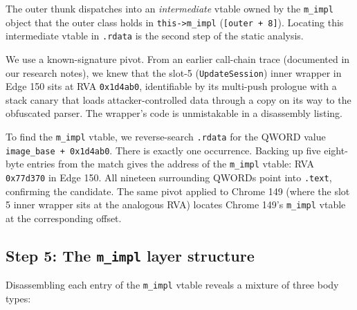 \documentclass[11pt,letterpaper]{article}
\begin{document}
The outer thunk dispatches into an \emph{intermediate} vtable owned
by the \texttt{m\_impl} object that the outer class holds in
\texttt{this->m\_impl} (\texttt{[outer + 8]}). Locating this
intermediate vtable in \texttt{.rdata} is the second step of the
static analysis.

We use a known-signature pivot. From an earlier call-chain trace
(documented in our research notes), we knew that the slot-5
(\texttt{UpdateSession}) inner wrapper in Edge 150 sits at RVA
\texttt{0x1d4ab0}, identifiable by its multi-push prologue with a
stack canary that loads attacker-controlled data through a copy on
its way to the obfuscated parser. The wrapper's code is unmistakable
in a disassembly listing.

To find the \texttt{m\_impl} vtable, we reverse-search \texttt{.rdata}
for the QWORD value \texttt{image\_base + 0x1d4ab0}. There is
exactly one occurrence. Backing up five eight-byte entries from the
match gives the address of the \texttt{m\_impl} vtable: RVA
\texttt{0x77d370} in Edge 150. All nineteen surrounding QWORDs
point into \texttt{.text}, confirming the candidate. The same pivot
applied to Chrome 149 (where the slot 5 inner wrapper sits at the
analogous RVA) locates Chrome 149's \texttt{m\_impl} vtable at the
corresponding offset.

\subsection{Step 5: The \texttt{m\_impl} layer structure}
\label{sec:static-layer2}

Disassembling each entry of the \texttt{m\_impl} vtable reveals a
mixture of three body types:
\end{document}
